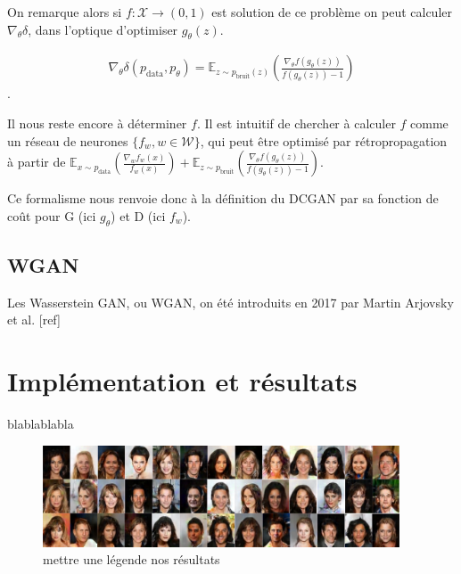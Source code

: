 On remarque alors si $f: \mathcal{X} \longrightarrow (0,1)$ est solution de ce problème on peut calculer $\nabla_{\theta} \delta$, dans l'optique d'optimiser $g_{\theta}(z)$. 

$$\begin{aligned}\nabla_{\theta} \delta(p_{\mathrm{data}}, p_{\theta}) = \mathbb{E}_{z\sim p_{\mathrm{bruit}}(z)} \left( \frac{\nabla_{\theta}f(g_{\theta}(z))}{f(g_{\theta}(z)) -1} \right)\end{aligned}$$.

Il nous reste encore à déterminer $f$. Il est intuitif de chercher à calculer $f$ comme un réseau de neurones $\{f_{w}, w \in \mathcal{W} \}$, qui peut être optimisé par rétropropagation à partir de  $\mathbb{E}_{x \sim p_{\mathrm{data}}}\left(\frac{\nabla_{w}f_{w}(x)}{f_{w}(x)}\right)+ \mathbb{E}_{z \sim p_{\mathrm{bruit}}}\left(\frac{\nabla_{\theta}f(g_{\theta}(z))}{f(g_{\theta}(z)) -1}\right)$.

Ce formalisme nous renvoie donc à la définition du DCGAN par sa fonction de coût pour G (ici $g_{\theta}$) et D (ici $f_{w}$).

\subsection{WGAN}

Les Wasserstein GAN, ou WGAN, on été introduits en 2017 par Martin Arjovsky et al. [ref]


\section{Implémentation et résultats}

blablablabla

\begin{figure}[!h]
\centering
\includegraphics[width=300pt]{"images/DCGAN"}
\caption{mettre une légende nos résultats}
\end{figure}
